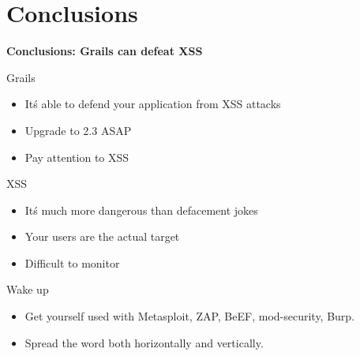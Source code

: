 
\section{Conclusions}

\begin{frame}[plain]
    \begin{center}
      \Huge\bfseries
      Conclusions: Grails can defeat XSS
    \end{center}
\end{frame}

\begin{frame}[plain]{Grails}
  \begin{itemize}
    \item It\'s able to defend your application from XSS attacks
    \item Upgrade to 2.3 ASAP
    \item Pay attention to XSS
  \end{itemize}
\end{frame}

\begin{frame}[plain]{XSS}
  \begin{itemize}
    \item It\'s much more dangerous than defacement jokes
    \item Your users are the actual target
    \item Difficult to monitor
  \end{itemize}
\end{frame}

\begin{frame}[plain]{Wake up}
 \begin{itemize}[<+-| alert@+>]
   \item Get yourself used with Metasploit, ZAP, BeEF, mod-security, Burp.
   \item Spread the word both horizontally and vertically.
 \end{itemize}
\end{frame}

